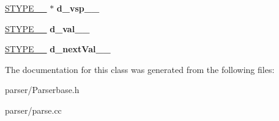 \begin{DoxyCompactItemize}
\item 
\hypertarget{classParserBase_a44b5207b10ba1ed06a4a060ff5a50f5f}{\hyperlink{unionParserBase_1_1STYPE____}{S\+T\+Y\+P\+E\+\_\+\+\_\+} $\ast$ {\bfseries d\+\_\+vsp\+\_\+\+\_\+}}\label{classParserBase_a44b5207b10ba1ed06a4a060ff5a50f5f}

\item 
\hypertarget{classParserBase_a8a05e4e641fc1f4d2e102482de8da07d}{\hyperlink{unionParserBase_1_1STYPE____}{S\+T\+Y\+P\+E\+\_\+\+\_\+} {\bfseries d\+\_\+val\+\_\+\+\_\+}}\label{classParserBase_a8a05e4e641fc1f4d2e102482de8da07d}

\item 
\hypertarget{classParserBase_a000a3b14a57cf84e85e2e0d0952648dd}{\hyperlink{unionParserBase_1_1STYPE____}{S\+T\+Y\+P\+E\+\_\+\+\_\+} {\bfseries d\+\_\+next\+Val\+\_\+\+\_\+}}\label{classParserBase_a000a3b14a57cf84e85e2e0d0952648dd}

\end{DoxyCompactItemize}


The documentation for this class was generated from the following files\+:\begin{DoxyCompactItemize}
\item 
parser/Parserbase.\+h\item 
parser/parse.\+cc\end{DoxyCompactItemize}
